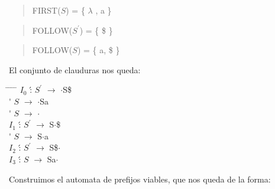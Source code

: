 \documentclass{article}
\begin{document}
\begin{enumerate}
\begin{enumerate}
\begin{enumerate}
\begin{quotation}
								\end{quotation}
								\begin{quotation}
									FIRST($S$) = \{ $\lambda$ , a \}
								\end{quotation}
								\begin{quotation}
									FOLLOW($S^{\prime}$) = \{ \$ \}
								\end{quotation}
								\begin{quotation}
									FOLLOW($S$) = \{ a, \$ \}
								\end{quotation}
								El conjunto de clauduras nos queda:\\
								\begin{tabbing}
								 \hspace*{1cm} \= \hspace*{1cm} \= \hspace*{0.6cm} \= \hspace*{0.6cm} \= \hspace*{3cm} \kill
									\> $I_{0}$	\' : 	\> $S^{\prime}$	\> $\longrightarrow$\> 	$\cdot$S\$ 	\\
									\>		\'  	\> $S$ 			\> $\longrightarrow$\> 	$\cdot$Sa 	\\
									\>		\'  	\> $S$ 			\> $\longrightarrow$\> 	$\cdot$ 	\\
								
									\>$I_{1}$	\' : 	\> $S^{\prime}$ \> $\longrightarrow$\> 	S$\cdot$\$	\\
									\>		\'  	\> $S$ 			\> $\longrightarrow$\> 	S$\cdot$a	\\
									
									\>$I_{2}$	\' : 	\> $S^{\prime}$ \> $\longrightarrow$\> 	S\$$\cdot$	\\
									
									\>$I_{3}$	\' : 	\> $S$ 			\> $\longrightarrow$\> 	Sa$\cdot$	\\
								\end{tabbing}
								Construimos el automata de prefijos viables, que nos queda de la forma:\\
				 				

\end{enumerate}
\end{enumerate}
\end{enumerate}
\end{document}
